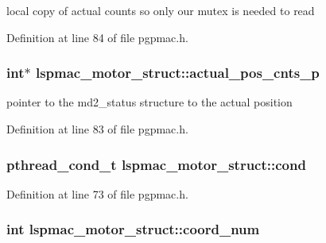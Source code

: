 local copy of actual counts so only our mutex is needed to read 



Definition at line 84 of file pgpmac.\-h.

\hypertarget{structlspmac__motor__struct_a312047bb71def5cd2443fecd875eaea5}{
\subsubsection[{actual\-\_\-pos\-\_\-cnts\-\_\-p}]{\setlength{\rightskip}{0pt plus 5cm}int$\ast$ lspmac\-\_\-motor\-\_\-struct\-::actual\-\_\-pos\-\_\-cnts\-\_\-p}}\label{structlspmac__motor__struct_a312047bb71def5cd2443fecd875eaea5}


pointer to the md2\-\_\-status structure to the actual position 



Definition at line 83 of file pgpmac.\-h.

\hypertarget{structlspmac__motor__struct_aa0ea4108b8fed5b41ff91ca7266f3d84}{
\subsubsection[{cond}]{\setlength{\rightskip}{0pt plus 5cm}pthread\-\_\-cond\-\_\-t lspmac\-\_\-motor\-\_\-struct\-::cond}}\label{structlspmac__motor__struct_aa0ea4108b8fed5b41ff91ca7266f3d84}


Definition at line 73 of file pgpmac.\-h.

\hypertarget{structlspmac__motor__struct_a2093b0a3cd2f9500fd92e3c89bf46577}{
\subsubsection[{coord\-\_\-num}]{\setlength{\rightskip}{0pt plus 5cm}int lspmac\-\_\-motor\-\_\-struct\-::coord\-\_\-num}}\label{structlspmac__motor__struct_a2093b0a3cd2f9500fd92e3c89bf46577}


